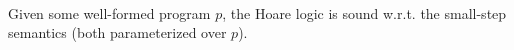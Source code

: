 \begin{lemma}\label{lemma:snd-svlidf}~\\
    Given some well-formed program $p$, the Hoare logic is sound w.r.t. the small-step semantics (both parameterized over $p$).
\end{lemma}